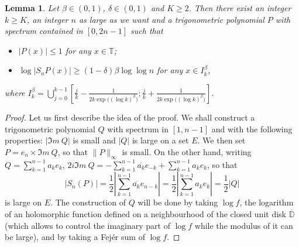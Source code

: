\documentclass[11pt,a4paper]{amsart}
\theoremstyle{plain}
\newtheorem{lemma}[theorem]{Lemma}
\begin{document}
\begin{lemma}\label{LEMBASICCT}
Let $\beta\in(0,1)$, $\delta\in(0,1)$ and $K\geq 2$. Then there exist an
integer $k\ge K$, an integer $n$ as large as we want and  
a trigonometric polynomial $P$ with spectrum contained in $[0,2n-1]$ such that
\begin{itemize}
\item $|P(x)|\leq 1$ for any $x\in{\mathbb T}$;
\item $\log |S_nP(x)|\geq (1-\delta)\beta\log\log n$ for any $x\in I_k^\beta$,
\end{itemize}
where $\displaystyle I_k^\beta=\bigcup_{j=0}^{k-1}\left[\frac jk-\frac{1}{2k\exp\big((\log k)^\beta\big)};\frac jk+\frac{1}{2k\exp\big((\log k)^\beta\big)}\right]$.
\end{lemma}
\begin{proof}
Let us first describe the idea of the proof. We shall construct a trigonometric polynomial $Q$ with spectrum in $[1,n-1]$ and with the following properties:
$|\Im m\ Q|$ is small and $|Q|$ is large on a set $E$. We then set $P=e_{n}\times \Im m\ Q$, so that $\|P\|_\infty$ is small. On the other hand,
writing $Q=\sum_{k=1}^{n-1} a_k e_k$, $2i\Im m\ Q=-\sum_{k=1}^{n-1}\overline{a_k}e_{-k}+\sum_{k=1}^{n-1} a_k e_k$, so that
$$|S_n (P)|=\frac 12\left| \sum_{k=1}^{n-1} \overline{a_k} e_{n-k}\right|=\frac12\left|\sum_{k=1}^{n-1} a_k e_k\right|=\frac12|Q|$$
is large on $E$. The construction of $Q$ will be done by taking $\log f$, the
logarithm of an holomorphic function defined on a neighbourhood of the closed
unit disk $\overline{\mathbb D}$ (which allows to control
the imaginary part of $\log f$ while the modulus of it can be large), and by taking a Fej\'er sum of $\log f$. 


\end{proof}
\end{document}
